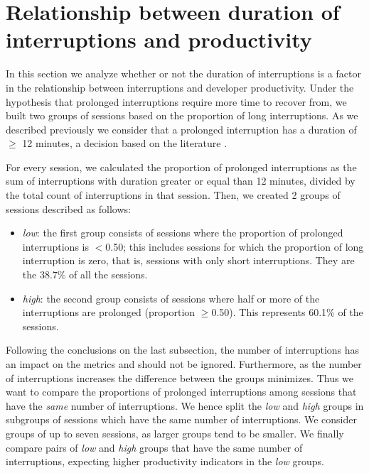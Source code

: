 \section{Relationship between duration of interruptions and productivity}

In this section we analyze whether or not the duration of interruptions is a factor in the relationship between interruptions and developer productivity. Under the hypothesis that prolonged interruptions require more time to recover from, we built two groups of sessions based on the proportion of long interruptions. As we described previously we consider that a prolonged interruption has a duration of $\geq$ 12 minutes, a decision based on the literature \cite{GM04, KaptelininN07}. %

For every session, we calculated the proportion of prolonged interruptions as the sum of interruptions with duration greater or equal than 12 minutes, divided by the total count of interruptions in that session. Then, we created 2 groups of sessions described as follows:

\begin{itemize}
	\item \textit{low}: the first group consists of sessions where the proportion of prolonged interruptions is $<$0.50; this includes sessions for which the proportion of long interruption is zero, that is, sessions with only short interruptions. They are the 38.7\% of all the sessions.
	\item \textit{high}: the second group consists of sessions where half or more of the interruptions are prolonged (proportion $\geq$0.50). This represents 60.1\% of the sessions.
\end{itemize} 

Following the conclusions on the last subsection, the number of interruptions has an impact on the metrics and should not be ignored. Furthermore, as the number of interruptions increases the difference between the groups minimizes.  %
Thus we want to compare the proportions of prolonged interruptions among sessions that have the \emph{same} number of interruptions. We hence split the \emph{low} and \emph{high} groups in subgroups of sessions which have the same number of interruptions. We consider groups of up to seven sessions, as larger groups tend to be smaller. We finally compare pairs of \emph{low} and \emph{high} groups that have the same number of interruptions, expecting higher productivity indicators in the \emph{low} groups.

